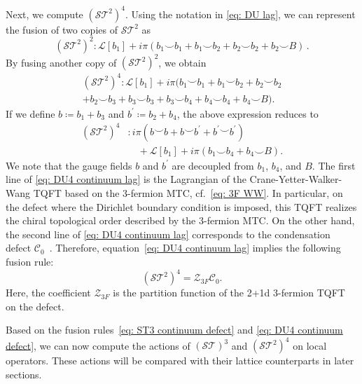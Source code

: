 \documentclass[aps,twocolumn,prx,floatfix,preprintnumbers, nofootinbib,10pt]{revtex4-2}
\numberwithin{equation}{section}
\theoremstyle{definition}
\theoremstyle{remark}
\theoremstyle{claim}
\begin{document}
\vspace*{\baselineskip}
Next, we compute $(\mathcal{S}\mathcal{T}^2)^4$.
Using the notation in \eqref{eq: DU lag}, we can represent the fusion of two copies of $\mathcal{S}\mathcal{T}^2$ as
\begin{equation}
(\mathcal{S}\mathcal{T}^2)^2: \mathcal{L}[b_1] + i \pi (b_1 {\smile} b_1 + b_1 {\smile} b_2 + b_2 {\smile} b_2 + b_2 {\smile} B) \,.
\end{equation}
By fusing another copy of $(\mathcal{S}\mathcal{T}^2)^2$, we obtain
\begin{multline}
 (\mathcal{S}\mathcal{T}^2)^4 : \mathcal{L}[b_1] + i \pi (b_1 \smile b_1 + b_1 \smile b_2 + b_2 \smile b_2 \\
 + b_2 \smile b_3 + b_3 \smile b_3 + b_3 \smile b_4 + b_4 \smile b_4 + b_4 \smile B).
\end{multline}
If we define $b \coloneq b_1+b_3$ and $b^{\prime} \coloneq b_2+b_4$, the above expression reduces to
\begin{equation}
\begin{aligned}
(\mathcal{S}\mathcal{T}^2)^4&: i \pi (b \smile b + b \smile b^{\prime} + b^{\prime} \smile b^{\prime}) \\
& \quad + \mathcal{L}[b_1] + i \pi (b_1 \smile b_4 + b_4 \smile B).
\end{aligned}
\label{eq: DU4 continuum lag}
\end{equation}
We note that the gauge fields $b$ and $b^{\prime}$ are decoupled from $b_1$, $b_4$, and $B$.
The first line of \eqref{eq: DU4 continuum lag} is the Lagrangian of the Crane-Yetter-Walker-Wang TQFT based on the 3-fermion MTC, cf.~\eqref{eq: 3F WW}.
In particular, on the defect where the Dirichlet boundary condition is imposed, this TQFT realizes the chiral topological order described by the 3-fermion MTC.
On the other hand, the second line of \eqref{eq: DU4 continuum lag} corresponds to the condensation defect $\mathcal{C}_0$~\cite{Choi:2022zal}.
Therefore, equation~\eqref{eq: DU4 continuum lag} implies the following fusion rule: 
\begin{equation}
(\mathcal{S}\mathcal{T}^2)^4 = \mathcal{Z}_{3F} \mathcal{C}_0.
\label{eq: DU4 continuum defect}
\end{equation}
Here, the coefficient $\mathcal{Z}_{3F}$ is the partition function of the 2+1d 3-fermion TQFT on the defect.

\vspace*{\baselineskip}
Based on the fusion rules~\eqref{eq: ST3 continuum defect} and \eqref{eq: DU4 continuum defect}, we can now compute the actions of $(\mathcal{ST})^3$ and $(\mathcal{S}\mathcal{T}^2)^4$ on local operators.
These actions will be compared with their lattice counterparts in later sections.
\end{document}
